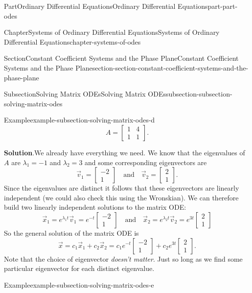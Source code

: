 \documentclass[twoside,10pt,]{book}
\newcommand{\blocktitlefont}{\relax}
\numberwithin{equation}{part}
\newcommand{\qq}[1]{\quad\text{#1}\quad}
\begin{document}
\begin{partptx}{Part}{Ordinary Differential Equations}{}{Ordinary Differential Equations}{}{}{part-part-odes}
\begin{chapterptx}{Chapter}{Systems of Ordinary Differential Equations}{}{Systems of Ordinary Differential Equations}{}{}{chapter-systems-of-odes}
\begin{sectionptx}{Section}{Constant Coefficient Systems and the Phase Plane}{}{Constant Coefficient Systems and the Phase Plane}{}{}{section-section-constant-coefficient-systems-and-the-phase-plane}
\begin{subsectionptx}{Subsection}{Solving Matrix ODEs}{}{Solving Matrix ODEs}{}{}{subsection-subsection-solving-matrix-odes}
\begin{example}{Example}{}{example-subsection-solving-matrix-odes-d}
\begin{equation*}
A = \begin{bmatrix}1& 4\\1& 1\end{bmatrix}.
\end{equation*}
%
\par\smallskip%
\noindent\textbf{\blocktitlefont Solution}.\hypertarget{solution-subsection-solving-matrix-odes-d-b}{}\quad{}We already have everything we need. We know that the eigenvalues of \(A\) are \(\lambda_{1}=-1\) and \(\lambda_{2}=3\) and some corresponding eigenvectors are%
\begin{equation*}
\vec{v}_{1} = \begin{bmatrix}-2\\1\end{bmatrix}\qq{and} \vec{v}_{2} = \begin{bmatrix}2\\1\end{bmatrix}.
\end{equation*}
Since the eigenvalues are distinct it follows that these eigenvectors are linearly independent (we could also check this using the Wronskian). We can therefore build two linearly independent solutions to the matrix ODE:%
\begin{equation*}
\vec{x}_{1} = e^{\lambda_{1}t}\vec{v}_{1} = e^{-t}\begin{bmatrix}-2\\1\end{bmatrix}\qq{and} \vec{x}_{2} = e^{\lambda_{2}t}\vec{v}_{2} = e^{3t}\begin{bmatrix}2\\1\end{bmatrix}
\end{equation*}
So the general solution of the matrix ODE is%
\begin{equation*}
\vec{x} = c_{1}\vec{x}_{1} + c_{2}\vec{x}_{2} = c_{1}e^{-t}\begin{bmatrix}-2\\1\end{bmatrix} + c_{2}e^{3t}\begin{bmatrix}2\\1\end{bmatrix}.
\end{equation*}
Note that the choice of eigenvector \emph{doesn't matter}. Just so long as we find some particular eigenvector for each distinct eigenvalue.%
\end{example}
\begin{example}{Example}{}{example-subsection-solving-matrix-odes-e}%

\end{example}
\end{subsectionptx}
\end{sectionptx}
\end{chapterptx}
\end{partptx}
\end{document}
